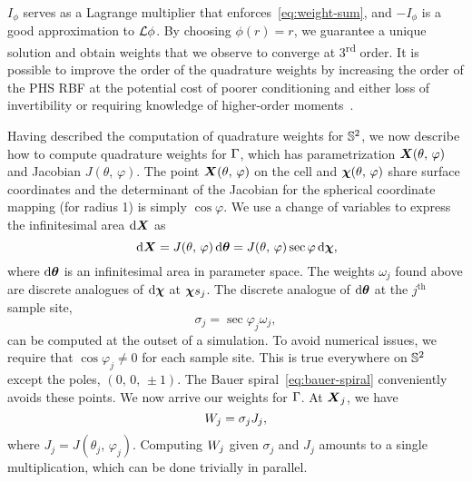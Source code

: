 $I_{\phi}$ serves as a Lagrange multiplier that enforces~\eqref{eq:weight-sum}, and
$-I_\phi$ is a good approximation to $\mathcal{L}\phi$. By choosing $\phi(r) = r$, we guarantee a
unique solution and obtain weights that we observe to converge at 3\textsuperscript{rd}
order. It is possible to improve the order of the quadrature weights by increasing the
order of the PHS RBF at the potential cost of poorer conditioning and either loss of
invertibility or requiring knowledge of higher-order moments~\cite{Fuselier:2013coba}.

Having described the computation of quadrature weights for $\mathbb{S}^2$, we now
describe how to compute quadrature weights for $\Gamma$, which has parametrization
$\boldsymbol{X}(\theta,\,\varphi)$ and Jacobian $J(\theta,\,\varphi)$. The point
$\boldsymbol{X}(\theta,\,\varphi)$ on the cell and $\boldsymbol{\chi}(\theta,\,\varphi)$ share surface coordinates
and the determinant of the Jacobian for the spherical coordinate mapping (for radius 1) is simply $\cos\varphi$.  We use a change of variables to
express the infinitesimal area $\d\X$ as
\begin{equation}\label{eq:quad-cov}
    \d\X
    = J(\theta,\,\varphi)\d\qs
    = J(\theta,\,\varphi)\sec\varphi\d\Xp,
\end{equation}
where $\d\qs$ is an infinitesimal area in parameter space. The weights $\omega_j$ found
above are discrete analogues of $\d\Xp$ at $\sample\Xp_j$. The discrete analogue of
$\d\qs$ at the $j^\text{th}$ sample site,
\begin{equation*}
    \sigma_j=\sec\varphi_j\omega_j,
\end{equation*}
can be computed at the outset of a simulation. To avoid numerical issues, we require that
$\cos\varphi_j \neq 0$ for each sample site. This is true everywhere on $\mathbb{S}^2$ except
the poles, $(0,\,0,\,\pm1)$. The Bauer spiral~\eqref{eq:bauer-spiral} conveniently avoids
these points. We now arrive our weights for $\Gamma$. At $\boldsymbol{X}_j$, we have
\begin{equation}
    \weight[j] = \sigma_j J_j,
\end{equation}
where $J_j = J(\theta_j,\,\varphi_j)$. Computing $\weight[j]$ given $\sigma_j$ and $J_j$
amounts to a single multiplication, which can be done trivially in parallel.


